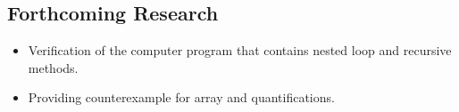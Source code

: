 \documentclass[a0,landscape]{a0poster}
\begin{document}
\begin{multicols}{4}
{\color{Blue} \subsection*{Forthcoming Research}}
\begin{itemize}
	\item Verification of the computer program that contains nested loop and recursive methods.
	\item Providing counterexample for array and quantifications.
\end{itemize}

\nocite{*} %
\renewcommand{\refname}{{\normalsize \color{Blue} References}}
{\small

} 

\end{multicols}
\end{document}
